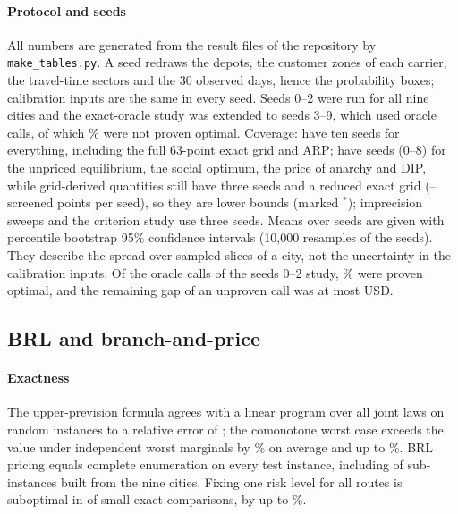 \documentclass[preprint,11pt]{elsarticle}
\theoremstyle{definition}
\theoremstyle{remark}
\begin{document}
\paragraph{Protocol and seeds} All numbers are generated from the result files of the repository by \texttt{make\_tables.py}. A seed redraws the depots, the customer zones of each carrier, the travel-time sectors and the 30 observed days, hence the probability boxes; calibration inputs are the same in every seed. Seeds 0--2 were run for all nine cities and the exact-oracle study was extended to seeds 3--9, which used \TenOracleCalls{} oracle calls, of which \TenUnprovenPct\% were not proven optimal. Coverage: \TenFullCities{} have ten seeds for everything, including the full 63-point exact grid and ARP; \TenRedCities{} have \TenRedSeedsMax{} seeds (0--8) for the unpriced equilibrium, the social optimum, the price of anarchy and DIP, while grid-derived quantities still have three seeds and a reduced exact grid (\ExEtwoRedMin--\ExEtwoRedMax{} screened points per seed), so they are lower bounds (marked $^*$); imprecision sweeps and the criterion study use three seeds. Means over seeds are given with percentile bootstrap 95\% confidence intervals (10{,}000 resamples of the seeds). They describe the spread over sampled slices of a city, not the uncertainty in the calibration inputs. Of the \ExCalls{} oracle calls of the seeds 0--2 study, \ExProvenPct\% were proven optimal, and the remaining gap of an unproven call was at most \ExMaxGap{} USD.

\subsection{BRL and branch-and-price}\label{sec:res-brl}

\paragraph{Exactness} The upper-prevision formula agrees with a linear program over all joint laws on \BRLtestAn{} random instances to a relative error of \BRLtestAerr; the comonotone worst case exceeds the value under independent worst marginals by \BRLindepMean\% on average and up to \BRLindepMax\%. BRL pricing equals complete enumeration on every test instance, including \BRLrealCmatch{} of \BRLrealCn{} sub-instances built from the nine cities. Fixing one risk level for all routes is suboptimal in \BRLfixeduSub{} of \BRLfixeduN{} small exact comparisons, by up to \BRLfixeduMax\%.
\end{document}
